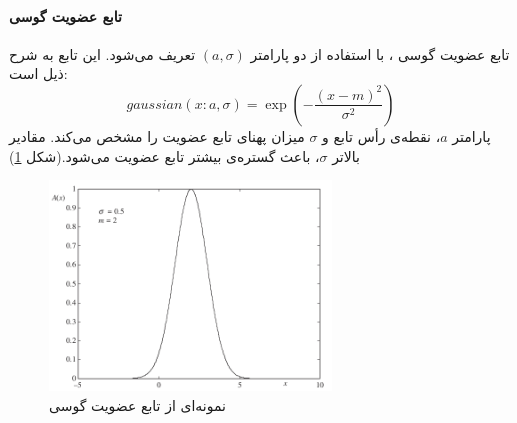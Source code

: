 \paragraph{تابع عضویت گوسی}
تابع عضویت گوسی
،
 با استفاده از دو پارامتر $(a, \sigma)$ تعریف می‌شود. این تابع به شرح ذیل است:
\begin{equation}\label{eq:e_fset_memfunc_gausi}
gaussian (x: a, \sigma) = \exp \left( - \frac{(x-m)^2}{\sigma^2} \right)
\end{equation}
پارامتر $a$، نقطه‌ی رأس تابع و $\sigma$ میزان پهنای تابع عضویت را مشخص می‌کند. مقادیر بالاتر $\sigma$، باعث گستره‌ی بیشتر تابع عضویت می‌شود.(شکل \ref{fig:f_16})
\cite{Pedrycz2007}
\begin{figure}[h]
	\centering 
	\includegraphics[width=75mm]{Images/Fig16.png}
	\vspace{-0.5cm}
	\caption{نمونه‌ای از تابع عضویت گوسی}\label{fig:f_16}
\end{figure}
